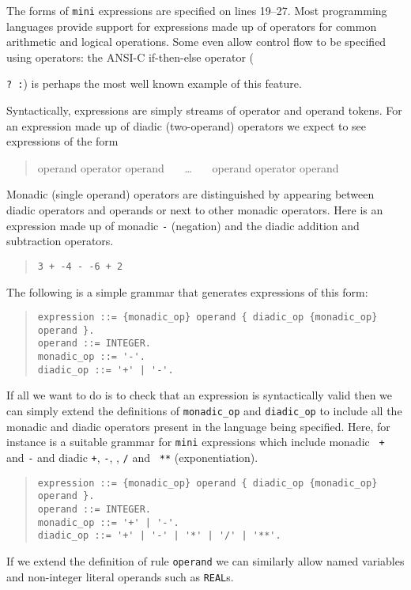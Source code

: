 The forms of {\tt mini} expressions are specified on lines 19--27.
Most programming languages provide support for expressions made up of
operators for common arithmetic and logical operations. Some even allow
control flow to  be specified using operators: the ANSI-C if-then-else
operator ({\verb+? :+) is perhaps the most well known
example of this feature.

Syntactically, expressions are simply streams of operator and operand
tokens. For an expression made up of diadic (two-operand) operators we
expect to see expressions of the form 
\begin{quote} operand operator operand ~~~\ldots~~~ operand operator operand
\end{quote}
Monadic (single operand) operators are
distinguished by appearing between diadic operators and operands or next to other
monadic operators. Here is an 
expression made up of monadic {\tt -} (negation) and the diadic addition
and subtraction operators.
\begin{quote}
\verb|3 + -4 - -6 + 2|
\end{quote}

The following is a simple grammar that generates expressions of this form:
\begin{quote}
\small
\begin{verbatim}
expression ::= {monadic_op} operand { diadic_op {monadic_op} operand }.
operand ::= INTEGER.
monadic_op ::= '-'.
diadic_op ::= '+' | '-'.
\end{verbatim}
\end{quote}

If all we want to do is to check that an expression is syntactically
valid then we can simply extend the definitions of \verb+monadic_op+ and
 \verb+diadic_op+ to include all the monadic and diadic operators
present in the language being specified. Here, for instance is a
suitable grammar for {\tt mini} expressions which include monadic {\tt
+} and {\tt -} and diadic {\tt +}, {\tt -}, {\tt *}, {\tt /} and {\tt
**} (exponentiation).

\begin{quote}
\small
\begin{verbatim}
expression ::= {monadic_op} operand { diadic_op {monadic_op} operand }.
operand ::= INTEGER.
monadic_op ::= '+' | '-'.
diadic_op ::= '+' | '-' | '*' | '/' | '**'.
\end{verbatim}
\end{quote}

If we extend the definition of rule {\tt operand} we can similarly allow
named variables and non-integer literal operands such as {\tt REAL}s.

}
